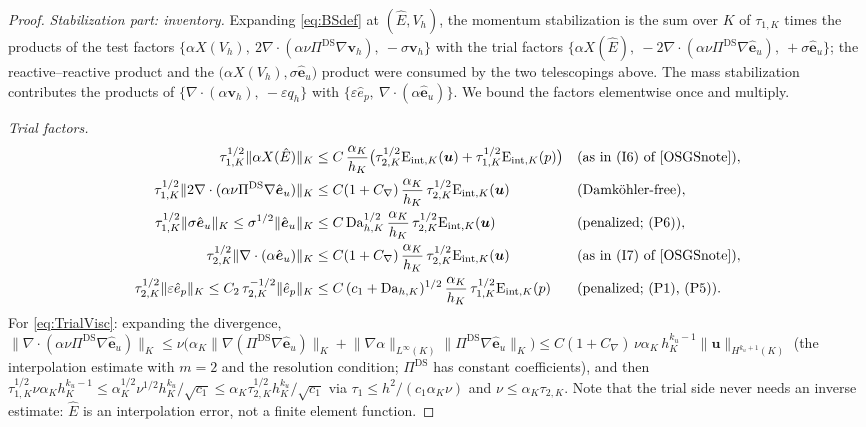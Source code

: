 \documentclass[11pt]{article}
\theoremstyle{remark}
\newcommand{\bu}{\boldsymbol{u}}
\newcommand{\bv}{\boldsymbol{v}}
\newcommand{\ViscProj}{\Pi^{\mathrm{DS}}}
\newcommand{\norm}[1]{\lVert #1 \rVert}
\newcommand{\normK}[1]{\lVert #1 \rVert_{K}}
\newcommand{\Eint}[2]{\mathrm{E}_{\mathrm{int},#1}(#2)}
\newcommand{\Dah}{\mathrm{Da}_{h,K}}
\begin{document}
\begin{proof}
\smallskip\noindent\emph{Stabilization part: inventory.}
Expanding \cref{eq:BSdef} at $(\hat E, V_h)$, the momentum stabilization is the sum
over $K$ of $\tau_{1,K}$ times the products of the test factors
$\{\alpha X(V_h),\ 2\nabla\cdot(\alpha\nu\ViscProj\nabla\bv_h),\ -\sigma\bv_h\}$
with the trial factors
$\{\alpha X(\hat E),\ -2\nabla\cdot(\alpha\nu\ViscProj\nabla\hat{\boldsymbol e}_u),\
+\sigma\hat{\boldsymbol e}_u\}$; the reactive--reactive product and the
$\bigl(\alpha X(V_h), \sigma\hat{\boldsymbol e}_u\bigr)$ product were consumed by
the two telescopings above. The mass stabilization contributes the products of
$\{\nabla\cdot(\alpha\bv_h),\ -\varepsilon q_h\}$ with
$\{\varepsilon\hat e_p,\ \nabla\cdot(\alpha\hat{\boldsymbol e}_u)\}$. We bound the
factors elementwise once and multiply.

\smallskip\noindent\emph{Trial factors.}
\begin{align}
  \tau_{1,K}^{1/2}\normK{\alpha X(\hat E)}
  &\le C\,\frac{\alpha_K}{h_K}\bigl( \tau_{2,K}^{1/2}\Eint{K}{\bu}
  + \tau_{1,K}^{1/2}\Eint{K}{p} \bigr)
  && \text{(as in (I6) of~\cite{OSGSnote})},
  \label{eq:TrialX}\\
  \tau_{1,K}^{1/2}\normK{2\nabla\cdot(\alpha\nu\ViscProj\nabla\hat{\boldsymbol e}_u)}
  &\le C(1+C_\nabla)\,\frac{\alpha_K}{h_K}\,\tau_{2,K}^{1/2}\Eint{K}{\bu}
  && \text{(Damk\"ohler-free)},
  \label{eq:TrialVisc}\\
  \tau_{1,K}^{1/2}\normK{\sigma\hat{\boldsymbol e}_u}
  \le \sigma^{1/2}\normK{\hat{\boldsymbol e}_u}
  &\le C\,\Dah^{1/2}\,\frac{\alpha_K}{h_K}\,\tau_{2,K}^{1/2}\Eint{K}{\bu}
  && \text{(penalized; (P6))},
  \label{eq:TrialReac}\\
  \tau_{2,K}^{1/2}\normK{\nabla\cdot(\alpha\hat{\boldsymbol e}_u)}
  &\le C(1+C_\nabla)\,\frac{\alpha_K}{h_K}\,\tau_{2,K}^{1/2}\Eint{K}{\bu}
  && \text{(as in (I7) of~\cite{OSGSnote})},
  \label{eq:TrialDiv}\\
  \tau_{2,K}^{1/2}\normK{\varepsilon \hat e_p}
  \le C_2\,\tau_{2,K}^{-1/2}\normK{\hat e_p}
  &\le C\,(c_1+\Dah)^{1/2}\,\frac{\alpha_K}{h_K}\,\tau_{1,K}^{1/2}\Eint{K}{p}
  && \text{(penalized; (P1), (P5))}.
  \label{eq:TrialEps}
\end{align}
For \cref{eq:TrialVisc}: expanding the divergence,
$\normK{\nabla\cdot(\alpha\nu\ViscProj\nabla\hat{\boldsymbol e}_u)}
\le \nu\bigl( \alpha_K \normK{\nabla(\ViscProj\nabla\hat{\boldsymbol e}_u)}
+ \norm{\nabla\alpha}_{L^\infty(K)}\normK{\ViscProj\nabla\hat{\boldsymbol e}_u}
\bigr)
\le C(1+C_\nabla)\,\nu\alpha_K\, h_K^{k_u-1}\norm{\bu}_{H^{k_u+1}(K)}$
(the interpolation estimate with $m = 2$ and the resolution condition; $\ViscProj$
has constant coefficients), and then
$\tau_{1,K}^{1/2}\nu\alpha_K h_K^{k_u-1}
\le \alpha_K^{1/2}\nu^{1/2}h_K^{k_u}/\sqrt{c_1}
\le \alpha_K\tau_{2,K}^{1/2}h_K^{k_u}/\sqrt{c_1}$
via $\tau_1 \le h^2/(c_1\alpha_K\nu)$ and $\nu \le \alpha_K\tau_{2,K}$. Note that
the trial side never needs an inverse estimate: $\hat E$ is an interpolation error,
not a finite element function.


\end{proof}
\end{document}
